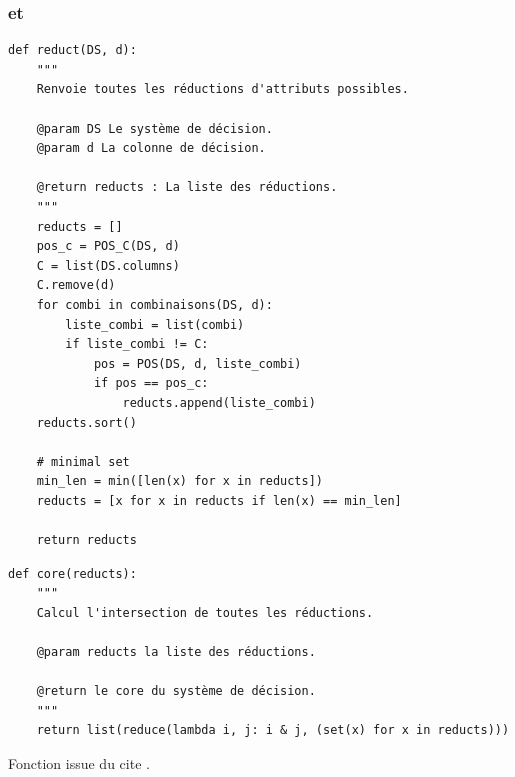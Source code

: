 \subsubsection{\reduct et \core}
\begin{lstlisting}
def reduct(DS, d):
	"""
	Renvoie toutes les réductions d'attributs possibles.

	@param DS Le système de décision.
	@param d La colonne de décision.

	@return reducts : La liste des réductions.
	"""
	reducts = []
	pos_c = POS_C(DS, d)
	C = list(DS.columns)
	C.remove(d)
	for combi in combinaisons(DS, d):
		liste_combi = list(combi)
		if liste_combi != C:
			pos = POS(DS, d, liste_combi)
			if pos == pos_c:
				reducts.append(liste_combi)
	reducts.sort()

	# minimal set
	min_len = min([len(x) for x in reducts])
	reducts = [x for x in reducts if len(x) == min_len]

	return reducts
\end{lstlisting}
\begin{lstlisting}
def core(reducts):
    """
	Calcul l'intersection de toutes les réductions.

	@param reducts la liste des réductions.

	@return le core du système de décision.
	"""
	return list(reduce(lambda i, j: i & j, (set(x) for x in reducts)))
\end{lstlisting}
Fonction issue du cite \cite{intersection_list}.
\newpage
